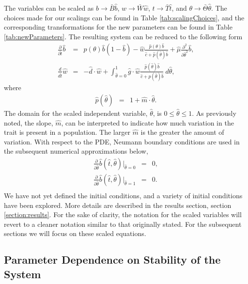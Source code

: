 \documentclass[review,authoryear]{elsarticle}
\newcommand{\origB}{{b}}
\newcommand{\origW}{{w}}
\newcommand{\origTheta}{{\theta}}
\newcommand{\origT}{{t}}
\newcommand{\scaledB}{\hat{b}}
\newcommand{\scaledW}{\hat{w}}
\newcommand{\scaledC}{\hat{c}}
\newcommand{\scaledD}{\hat{d}}
\newcommand{\scaledG}{\hat{g}}
\newcommand{\scaledP}[1]{\hat{p}(#1)}
\newcommand{\scaledTheta}{\hat{\theta}}
\newcommand{\scaledT}{\hat{t}}
\newcommand{\scaledMu}{\hat{\mu}}
\newcommand{\scaledM}{\hat{m}}
\begin{document}
The variables can be scaled as $\origB\rightarrow \bar{B}\scaledB$,
$\origW\rightarrow \bar{W}\scaledW$, $\origT\rightarrow \bar{T}\scaledT$, and
$\origTheta\rightarrow \bar{\Theta}\scaledTheta$. The choices made for our
scalings can be found in Table \ref{tab:scalingChoices}, and the
corresponding transformations for the new parameters can be found in
Table \ref{tab:newParameters}.  The resulting system can be reduced to
the following form
\begin{eqnarray}
  \label{eq:scaledodePDE1}
  \frac{\partial}{\partial \scaledT} \scaledB & = &
      p(\theta) \scaledB (1 - \scaledB)
      -  \scaledW \frac{\scaledP{\theta} \scaledB}{\scaledC+\scaledP{\scaledTheta}\scaledB}
      + \scaledMu \frac{\partial^2}{\partial \scaledTheta^2} \scaledB , \\
  \label{eq:scaledodePDE2}
  \frac{d}{d\scaledT} \scaledW & = & -\scaledD \cdot \scaledW +
      \int^1_{\scaledTheta=0} \scaledG \cdot \scaledW \frac{\scaledP{\scaledTheta} \scaledB }{\scaledC + \scaledP{\scaledTheta} \scaledB} ~ d\scaledTheta,
\end{eqnarray}
where
\begin{eqnarray}
  \scaledP{\scaledTheta} & = & 1 + \scaledM \cdot \scaledTheta.
\end{eqnarray}
The domain for the scaled independent variable, $\scaledTheta$, is
$0\leq\scaledTheta\leq 1$. As previously noted, the slope, $\scaledM$, can be
interpreted to indicate how much variation in the trait is present in
a population. The larger $\scaledM$ is the greater the amount of variation.
With respect to the PDE, Neumann boundary conditions are used in the
subsequent numerical approximations below,
\begin{eqnarray*}
  \frac{\partial}{\partial\scaledTheta} \scaledB(\scaledT,\scaledTheta) \bigg|_{\scaledTheta=0} & = & 0, \\
  \frac{\partial}{\partial\scaledTheta} \scaledB(\scaledT,\scaledTheta) \bigg|_{\scaledTheta=1} & = & 0. \\
\end{eqnarray*}
We have not yet defined the initial conditions, and
a variety of initial
conditions have been explored. More details are  described in the results
section, section \ref{section:results}. For the sake of clarity, the notation for the scaled variables will revert to a cleaner notation similar to that originally stated. For the subsequent sections we will focus on these scaled equations.


\subsection{Parameter Dependence on Stability of the System}
\label{subsection:parameters}
\end{document}
